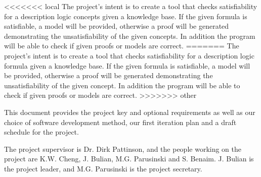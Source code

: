 <<<<<<< local
The project's intent is to create a tool that checks satisfiability for a description logic concepts given a knowledge base. If the given formula is satisfiable, a model will be provided, otherwise a proof will be generated demonstrating the unsatisfiability of the given concepts. In addition the program will be able to check if given proofs or models are correct.
=======
The project's intent is to create a tool that checks satisfiability for a description logic formula given a knowledge base. If the given formula is satisfiable, a model will be provided, otherwise a proof will be generated demonstrating the unsatisfiability of the given concept. In addition the program will be able to check if given proofs or models are correct.
>>>>>>> other

This document provides the project key and optional requirements as well as our choice of software development method, our first iteration plan and a draft schedule for the project.

The project supervisor is Dr. Dirk Pattinson, and the people working on the project
are K.W. Cheng, J. Bulian, M.G. Parusinski and S. Benaim. J. Bulian is the project leader, and M.G. Parusinski is the project secretary.
